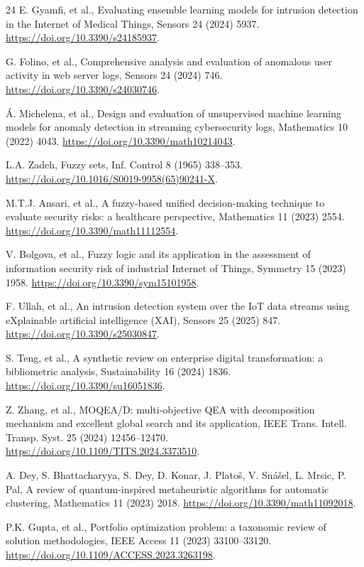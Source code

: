 \documentclass[preprint,12pt]{elsarticle}
\begin{document}
\begin{thebibliography}{24}
 E. Gyamfi, et al., Evaluating ensemble learning models for intrusion
detection in the Internet of Medical Things, Sensors 24 (2024) 5937.
\url{https://doi.org/10.3390/s24185937}.

 G. Folino, et al., Comprehensive analysis and evaluation of
anomalous user activity in web server logs, Sensors 24 (2024) 746.
\url{https://doi.org/10.3390/s24030746}.

 \'A. Michelena, et al., Design and evaluation of unsupervised
machine learning models for anomaly detection in streaming cybersecurity logs,
Mathematics 10 (2022) 4043. \url{https://doi.org/10.3390/math10214043}.

 L.A. Zadeh, Fuzzy sets, Inf. Control 8 (1965) 338--353.
\url{https://doi.org/10.1016/S0019-9958(65)90241-X}.

 M.T.J. Ansari, et al., A fuzzy-based unified decision-making
technique to evaluate security risks: a healthcare perspective, Mathematics 11 (2023)
2554. \url{https://doi.org/10.3390/math11112554}.

 V. Bolgova, et al., Fuzzy logic and its application in the
assessment of information security risk of industrial Internet of Things, Symmetry 15
(2023) 1958. \url{https://doi.org/10.3390/sym15101958}.

 F. Ullah, et al., An intrusion detection system over the IoT
data streams using eXplainable artificial intelligence (XAI), Sensors 25 (2025) 847.
\url{https://doi.org/10.3390/s25030847}.

 S. Teng, et al., A synthetic review on enterprise digital
transformation: a bibliometric analysis, Sustainability 16 (2024) 1836.
\url{https://doi.org/10.3390/su16051836}.

 Z. Zhang, et al., MOQEA/D: multi-objective QEA with decomposition
mechanism and excellent global search and its application, IEEE Trans. Intell. Transp.
Syst. 25 (2024) 12456--12470. \url{https://doi.org/10.1109/TITS.2024.3373510}.

 A. Dey, S. Bhattacharyya, S. Dey, D. Konar, J. Plato\v{s},
V. Sn\'{a}\v{s}el, L. Mrsic, P. Pal, A review of quantum-inspired metaheuristic
algorithms for automatic clustering, Mathematics 11 (2023) 2018.
\url{https://doi.org/10.3390/math11092018}.

 P.K. Gupta, et al., Portfolio optimization problem: a taxonomic
review of solution methodologies, IEEE Access 11 (2023) 33100--33120.
\url{https://doi.org/10.1109/ACCESS.2023.3263198}.


\end{thebibliography}
\end{document}

